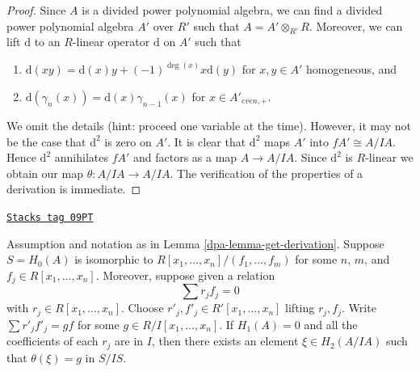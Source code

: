 \begin{proof}
Since $A$ is a divided power polynomial algebra, we can find a divided
power polynomial algebra $A'$ over $R'$ such that $A = A' \otimes_{R'} R$.
Moreover, we can lift $\text{d}$ to an $R$-linear
operator $\text{d}$ on $A'$ such that
\begin{enumerate}
\item  $\text{d}(xy) = \text{d}(x)y + (-1)^{\deg(x)}x \text{d}(y)$
for $x, y \in A'$ homogeneous, and
\item  $\text{d}(\gamma_n(x)) = \text{d}(x) \gamma_{n - 1}(x)$ for
$x \in A'_{even, +}$.
\end{enumerate}
We omit the details (hint: proceed one variable at the time).
However, it may not be the case that $\text{d}^2$
is zero on $A'$. It is clear that $\text{d}^2$ maps $A'$ into
$fA' \cong A/IA$. Hence $\text{d}^2$ annihilates $fA'$ and factors
as a map $A \to A/IA$. Since $\text{d}^2$ is $R$-linear we obtain
our map $\theta : A/IA \to A/IA$. The verification of the properties
of a derivation is immediate.
\end{proof}

\begin{lemma}
\label{dpa-lemma-compute-theta}
\href{https://stacks.math.columbia.edu/tag/09PT}{\texttt{Stacks tag 09PT}}

Assumption and notation as in Lemma \ref{dpa-lemma-get-derivation}.
Suppose $S = H_0(A)$ is isomorphic to
$R[x_1, \ldots, x_n]/(f_1, \ldots, f_m)$
for some $n$, $m$, and $f_j \in R[x_1, \ldots, x_n]$.
Moreover, suppose given a relation
$$
\sum r_j f_j = 0
$$
with $r_j \in R[x_1, \ldots, x_n]$.
Choose $r'_j, f'_j \in R'[x_1, \ldots, x_n]$ lifting $r_j, f_j$.
Write $\sum r'_j f'_j = gf$ for some $g \in R/I[x_1, \ldots, x_n]$.
If $H_1(A) = 0$ and all the coefficients of each $r_j$ are in $I$, then
there exists an element $\xi \in H_2(A/IA)$ such that
$\theta(\xi) = g$ in $S/IS$.
\end{lemma}

